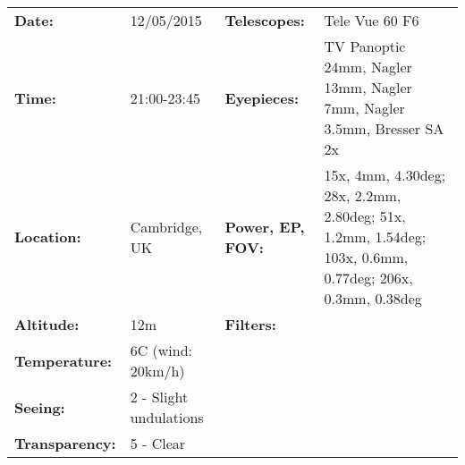 \begin{tabular}{ p{0.9in} p{1.3in} p{1.2in} p{5.2in}}
{\bf Date:} & 12/05/2015 & {\bf Telescopes:} & Tele Vue 60 F6 \\ 
{\bf Time:} & 21:00-23:45 & {\bf Eyepieces:} & TV Panoptic 24mm, Nagler 13mm, Nagler 7mm, Nagler 3.5mm, Bresser SA 2x \\ 
{\bf Location:} & Cambridge, UK & {\bf Power, EP, FOV:} & 15x, 4mm, 4.30deg; 28x, 2.2mm, 2.80deg; 51x, 1.2mm, 1.54deg; 103x, 0.6mm, 0.77deg; 206x, 0.3mm, 0.38deg \\ 
{\bf Altitude:} & 12m & {\bf Filters:} &  \\ 
{\bf Temperature:} & 6C (wind: 20km/h) & & \\ 
{\bf Seeing:} & 2 - Slight undulations & & \\ 
{\bf Transparency:} & 5 - Clear & & \\ 
\end{tabular}
\centering 
